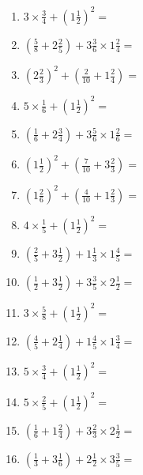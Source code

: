 \documentclass[12pt]{article}
\begin{document}
\begin{enumerate}
\item \large $ 3 \times \frac{3}{4} + (1 \frac{1}{2})^2 = $ \vspace{1.8cm}
\item \large $ (\frac{5}{8} + 2 \frac{2}{5}) + 3 \frac{3}{6} \times 1 \frac{2}{4} = $ \vspace{1.8cm}
\item \large $ (2 \frac{2}{3})^2 + (\frac{2}{10} + 1 \frac{2}{4}) = $ \vspace{1.8cm}
\item \large $ 5 \times \frac{1}{6} + (1 \frac{1}{2})^2 = $ \vspace{1.8cm}
\item \large $ (\frac{1}{6} + 2 \frac{3}{4}) + 3 \frac{5}{6} \times 1 \frac{2}{6} = $ \vspace{1.8cm}
\newpage
\item \large $ (1 \frac{1}{2})^2 + (\frac{7}{10} + 3 \frac{2}{3}) = $ \vspace{1.8cm}
\item \large $ (1 \frac{2}{6})^2 + (\frac{4}{10} + 1 \frac{2}{3}) = $ \vspace{1.8cm}
\item \large $ 4 \times \frac{1}{5} + (1 \frac{1}{2})^2 = $ \vspace{1.8cm}
\item \large $ (\frac{2}{5} + 3 \frac{1}{2}) + 1 \frac{1}{3} \times 1 \frac{4}{5} = $ \vspace{1.8cm}
\item \large $ (\frac{1}{2} + 3 \frac{1}{2}) + 3 \frac{3}{5} \times 2 \frac{1}{2} = $ \vspace{1.8cm}
\item \large $ 3 \times \frac{5}{8} + (1 \frac{1}{2})^2 = $ \vspace{1.8cm}
\item \large $ (\frac{4}{5} + 2 \frac{1}{4}) + 1 \frac{4}{5} \times 1 \frac{3}{4} = $ \vspace{1.8cm}
\item \large $ 5 \times \frac{3}{4} + (1 \frac{1}{2})^2 = $ \vspace{1.8cm}
\item \large $ 5 \times \frac{2}{5} + (1 \frac{1}{2})^2 = $ \vspace{1.8cm}
\item \large $ (\frac{1}{6} + 1 \frac{2}{4}) + 3 \frac{2}{3} \times 2 \frac{1}{2} = $ \vspace{1.8cm}
\newpage
\item \large $ (\frac{1}{3} + 3 \frac{1}{6}) + 2 \frac{1}{2} \times 3 \frac{3}{5} = $ \vspace{1.8cm}

\end{enumerate}
\end{document}
